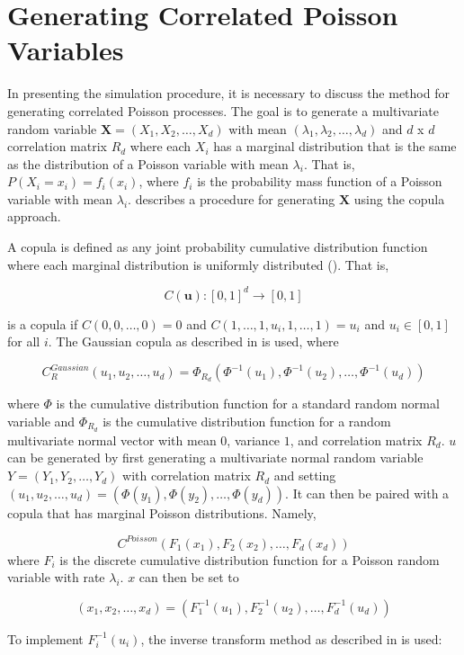 \section{Generating Correlated Poisson Variables}\label{ch:generate_correlated_poisson}
In presenting the simulation procedure, it is necessary to discuss the method for generating correlated Poisson processes. The goal is to generate a multivariate random variable $\boldsymbol{X} = (X_1, X_2, \ldots, X_d)$ with mean $(\lambda_1, \lambda_2, \ldots, \lambda_{d})$ and $d$ x $d$ correlation matrix $R_d$ where each $X_i$ has a marginal distribution that is the same as the distribution of a Poisson variable with mean $\lambda_i$. That is, $P(X_i = x_i) = f_i(x_i)$, where $f_i$ is the probability mass function of a Poisson variable with mean $\lambda_i$. \cite{A8} describes a procedure for generating $\boldsymbol{X}$ using the copula approach. 

A copula is defined as any joint probability cumulative distribution function where each marginal distribution is uniformly distributed (\cite{B1}). That is, 

$$C(\boldsymbol{u}): [0,1]^d \to [0,1]$$ 

is a copula if $C(0, 0, \ldots, 0) = 0$ and $C(1, \ldots, 1, u_i, 1, \ldots, 1) = u_i$ and $u_i \in [0,1]$ for all $i$. The Gaussian copula as described in \cite{A8} is used, where

$$ C_R^{Gaussian}(u_1, u_2, \ldots, u_d) = \Phi_{R_d}(\Phi^{-1}(u_1), \Phi^{-1}(u_2), \ldots,  \Phi^{-1}(u_d))$$

where $\Phi$ is the cumulative distribution function for a standard random normal variable and $\Phi_{R_d}$ is the cumulative distribution function for a random multivariate normal vector with mean $0$, variance $1$, and correlation matrix $R_d$. $u$ can be generated by first generating a multivariate normal random variable $Y = (Y_1,Y_2, \ldots, Y_d)$ with correlation matrix $R_d$ and setting $(u_1, u_2, \ldots, u_d) = (\Phi(y_1), \Phi(y_2), \ldots,  \Phi(y_d))$. It can then be paired with a copula that has marginal Poisson distributions. Namely,

$$ C^{Poisson}(F_1(x_1), F_2(x_2), \ldots, F_d(x_d))$$ where $F_i$ is the discrete cumulative distribution function for a Poisson random variable with rate $\lambda_i$. $x$ can then be set to

$$(x_1, x_2, \ldots, x_d) = (F^{-1}_1(u_1), F^{-1}_2(u_2), \ldots, F^{-1}_d(u_d))$$

To implement $F^{-1}_i(u_i)$, the inverse transform method as described in \cite{B1} is used:
$$ $$

